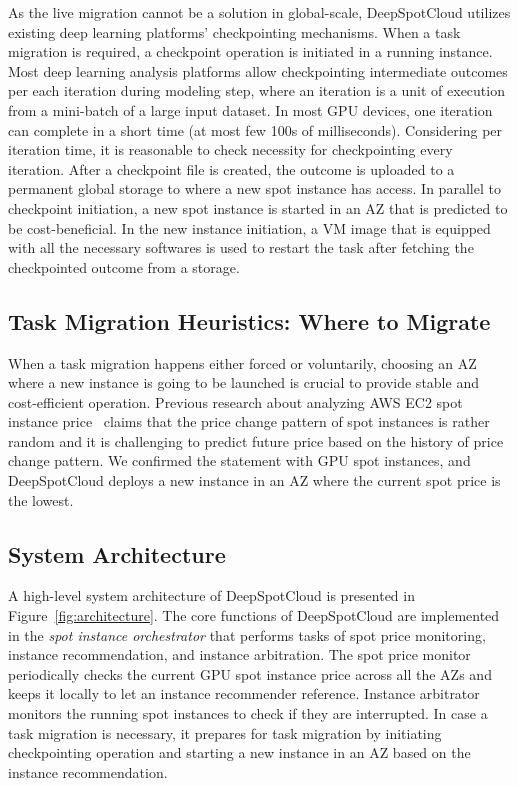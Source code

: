 \documentclass[conference]{IEEEtran}
\begin{document}
As the live migration cannot be a solution in global-scale, DeepSpotCloud utilizes existing deep learning platforms' checkpointing mechanisms. When a task migration is required, a checkpoint operation is initiated in a running instance. Most deep learning analysis platforms allow checkpointing intermediate outcomes per each iteration during modeling step, where an iteration is a unit of execution from a mini-batch of a large input dataset. In most GPU devices, one iteration can complete in a short time (at most few 100s of milliseconds). Considering per iteration time, it is reasonable to check necessity for checkpointing every iteration. After a checkpoint file is created, the outcome is uploaded to a permanent global storage to where a new spot instance has access. In parallel to checkpoint initiation, a new spot instance is started in an AZ that is predicted to be cost-beneficial. In the new instance initiation, a VM image that is equipped with all the necessary softwares is used to restart the task after fetching the checkpointed outcome from a storage.

\subsection{Task Migration Heuristics: Where to Migrate}
When a task migration happens either forced or voluntarily, choosing an AZ where a new instance is going to be launched is crucial to provide stable and cost-efficient operation. Previous research about analyzing AWS EC2 spot instance price~\cite{spot-instance-pricing-analysis} claims that the price change pattern of spot instances is rather random and it is challenging to predict future price based on the history of price change pattern. We confirmed the statement with GPU spot instances, and DeepSpotCloud deploys a new instance in an AZ where the current spot price is the lowest.

\subsection{System Architecture}\label{sec:architecture}
A high-level system architecture of DeepSpotCloud is presented in Figure~\ref{fig:architecture}. The core functions of DeepSpotCloud are implemented in the \textit{spot instance orchestrator} that performs tasks of spot price monitoring, instance recommendation, and instance arbitration. The spot price monitor periodically checks the current GPU spot instance price across all the AZs and keeps it locally to let an instance recommender reference. Instance arbitrator monitors the running spot instances to check if they are interrupted. In case a task migration is necessary, it prepares for task migration by initiating checkpointing operation and starting a new instance in an AZ based on the instance recommendation.
\end{document}
